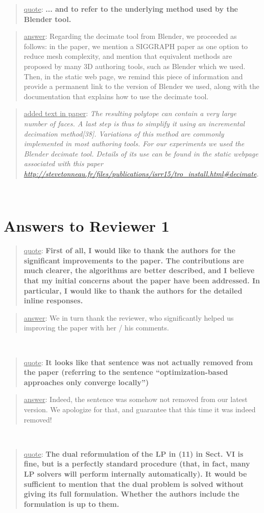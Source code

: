 \documentclass[a4paper]{article}
\newcommand{\ndone}[0]{\textcolor{red}{TODO}}
\newcommand\quot[1]{\begin{quote} \underline{quote}: \textbf{#1}\end{quote}}
\newcommand\as[1]{\begin{quote} \underline{answer}: {#1}\end{quote} }
\newcommand\qt[1]{\begin{quote} \underline{added text in paper}: \textit{#1}\end{quote} \leavevmode \\ }
\begin{document}
\leavevmode 
\quot {... and to refer
to the underlying method used by the Blender tool.}

\as{Regarding the decimate tool from Blender, we proceeded as follows: in the paper, we mention a SIGGRAPH paper as one option to reduce mesh complexity, and mention that equivalent methods are proposed by many 3D authoring tools, such as Blender which we used. Then, in the static web page, we remind this piece of information and provide a permanent link to the version of Blender we used, along with the documentation that explains how to use the decimate tool.}

\qt{The resulting polytope can contain a very large number of faces.  A last step is thus to simplify it using an incremental decimation method[38].
Variations of this method are commonly implemented in most authoring tools. For our experiments we used the Blender decimate tool. Details of its use can be found in the static webpage associated with this paper \url{http://stevetonneau.fr/files/publications/isrr15/tro_install.html\#decimate}.\\}

\section{Answers to Reviewer 1}

\quot{First of all, I would like to thank the authors for the significant
improvements to the paper. The contributions are much clearer, the
algorithms are better described, and I believe that my initial concerns
about the paper have been addressed. In particular, I would like to
thank the authors for the detailed inline responses.}

\as{We in turn thank the reviewer, who significantly helped us improving the paper with her / his comments.}

\leavevmode \\
\quot {It looks like that sentence was not actually removed from the
paper (referring to the sentence ``optimization-based approaches
only converge locally'')
}

\as{Indeed, the sentence was somehow not removed from our latest version. We apologize for that, and guarantee that this time it was indeed removed!}

\leavevmode \\
\quot {
The dual reformulation of the LP in (11) in Sect. VI is fine, but is
a perfectly standard procedure (that, in fact, many LP solvers will
perform internally automatically). It would be sufficient to mention
that the dual problem is solved without giving its full formulation.
Whether the authors include the formulation is up to them.}
\end{document}
